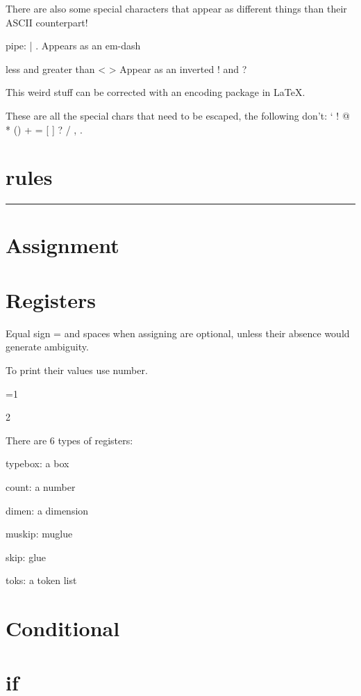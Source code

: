   There are also some special characters that appear as different things than their ASCII counterpart!

  \item pipe: | . Appears as an em-dash
  \item less and greater than < > Appear as an inverted ! and ?

  This weird stuff can be corrected with an encoding package in LaTeX.

  These are all the special chars that need to be escaped, the following don't: ` ! @ * () + = [  ] ? / , .

\section{rules}

  \hrule

  \vrule height .25in

\section{Assignment}

\section{Registers}

  Equal sign = and spaces when assigning are optional, unless their absence would generate ambiguity.

  To print their values use \bs number.

  =1

  \number{}

   2

  \number{}


  There are 6 types of registers:

  typebox: a box

  count:   a number

  dimen:   a dimension

  muskip:  muglue

  skip:    glue

  toks:    a token list

\section{Conditional}

\section{if}

